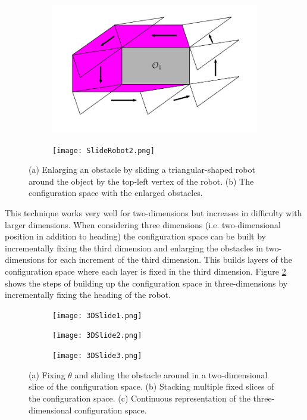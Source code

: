 \documentclass[twoside]{article}
\begin{document}
\begin{figure}[H]
\centering
\begin{subfigure}[t]{0.49\textwidth}
\centering
\includegraphics[width=\columnwidth]{SlideRobot1.png}
\caption{}
\end{subfigure}
\hfil
\begin{subfigure}[t]{0.49\textwidth}
\centering
\texttt{[image: SlideRobot2.png]}
\caption{}
\end{subfigure}

\caption{(a) Enlarging an obstacle by sliding a triangular-shaped robot around the object by the top-left vertex of the robot. (b) The configuration space with the enlarged obstacles.}
\label{fig:2Dslide}
\end{figure}

This technique works very well for two-dimensions but increases in difficulty with larger dimensions. When considering three dimensions (i.e. two-dimensional position in addition to heading) the configuration space can be built by incrementally fixing the third dimension and enlarging the obstacles in two-dimensions for each increment of the third dimension. This builds layers of the configuration space where each layer is fixed in the third dimension. Figure \ref{fig:3Dslide} shows the steps of building up the configuration space in three-dimensions by incrementally fixing the heading of the robot.

\begin{figure}[H]
\centering
\begin{subfigure}[t]{0.32\textwidth}
\centering
\texttt{[image: 3DSlide1.png]}
\caption{}
\end{subfigure}
\hfil
\begin{subfigure}[t]{0.32\textwidth}
\centering
\texttt{[image: 3DSlide2.png]}
\caption{}
\end{subfigure}
\hfil
\begin{subfigure}[t]{0.32\textwidth}
\centering
\texttt{[image: 3DSlide3.png]}
\caption{}
\end{subfigure}

\caption{(a) Fixing $\theta$ and sliding the obstacle around in a two-dimensional slice of the configuration space. (b) Stacking multiple fixed slices of the configuration space. (c) Continuous representation of the three-dimensional configuration space.}
\label{fig:3Dslide}
\end{figure}
\end{document}
